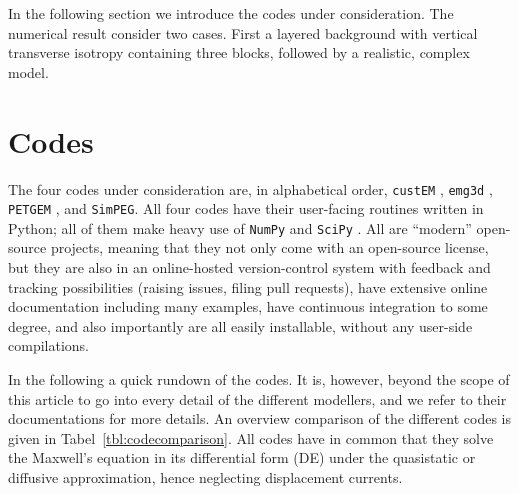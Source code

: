 \documentclass[
    paper,
  ]{geophysics}
\newcommand{\emg}[2]{\texttt{emg#1#2}\xspace}
\newcommand{\simpeg}{\texttt{SimPEG}\xspace}
\newcommand{\custem}{\texttt{custEM}\xspace}
\newcommand{\petgem}{\texttt{PETGEM}\xspace}
\begin{document}
In the following section we introduce the codes under consideration. The
numerical result consider two cases. First a layered background with vertical
transverse isotropy containing three blocks, followed by a realistic, complex
model.

\clearpage  %
\section{Codes}

The four codes under consideration are, in alphabetical order, \custem
\citep{GEO.19.Rochlitz}, \emg3d \citep{JOSS.19.Werthmuller}, \petgem
\citep{GJI.19.CastilloReyes}, and \simpeg \citep{CAG.15.Cockett}. All four
codes have their user-facing routines written in Python; all of them make heavy
use of \texttt{NumPy} \citep{CSE.11.VanDerWalt} and \texttt{SciPy}
\citep{NM.20.Virtanen}. All are “modern” open-source projects, meaning that
they not only come with an open-source license, but they are also in an
online-hosted version-control system with feedback and tracking possibilities
(raising issues, filing pull requests), have extensive online documentation
including many examples, have continuous integration to some degree, and also
importantly are all easily installable, without any user-side compilations.

In the following a quick rundown of the codes. It is, however, beyond the scope
of this article to go into every detail of the different modellers, and we
refer to their documentations for more details. An overview comparison of the
different codes is given in Tabel~\ref{tbl:codecomparison}. All codes have in
common that they solve the Maxwell's equation in its differential form (DE)
under the quasistatic or diffusive approximation, hence neglecting displacement
currents.
\end{document}
